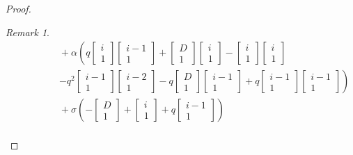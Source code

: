 \documentclass[
]{book}
\theoremstyle{definition}
\theoremstyle{definition}
\theoremstyle{definition}
\theoremstyle{definition}
\theoremstyle{remark}
\newtheorem*{remark}{Remark}
\begin{document}
\begin{proof}
\begin{remark}
\begin{align}
& \qquad\qquad + \alpha\left(q\begin{bmatrix}{i}\\{1}\end{bmatrix}\begin{bmatrix}{i-1}\\{1}\end{bmatrix}+\begin{bmatrix}{D}\\{1}\end{bmatrix}\begin{bmatrix}{i}\\{1}\end{bmatrix}-\begin{bmatrix}{i}\\{1}\end{bmatrix}\begin{bmatrix}{i}\\{1}\end{bmatrix}\right.\\
& \qquad\qquad \left.-q^2\begin{bmatrix}{i-1}\\{1}\end{bmatrix}\begin{bmatrix}{i-2}\\{1}\end{bmatrix}-q\begin{bmatrix}{D}\\{1}\end{bmatrix}\begin{bmatrix}{i-1}\\{1}\end{bmatrix}+q\begin{bmatrix}{i-1}\\{1}\end{bmatrix}\begin{bmatrix}{i-1}\\{1}\end{bmatrix}\right)\\
& \qquad\qquad + \sigma\left(-\begin{bmatrix}{D}\\{1}\end{bmatrix}+\begin{bmatrix}{i}\\{1}\end{bmatrix} + q\begin{bmatrix}{i-1}\\{1}\end{bmatrix}\right)\\

\end{align}
\end{remark}
\end{proof}
\end{document}
